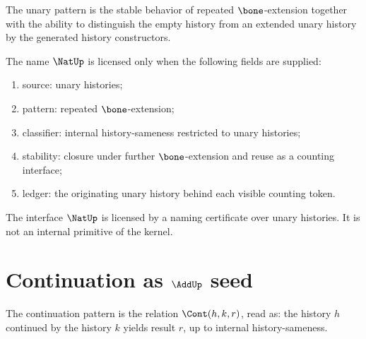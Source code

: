 \begin{definition}
\label{def:unary-pattern-hardening}
The unary pattern is the stable behavior of repeated \(\bone\)-extension together with the ability to distinguish the empty history from an extended unary history by the generated history constructors.
\end{definition}

\begin{definition}
\label{def:natup-certificate-seed}
The name \(\NatUp\) is licensed only when the following fields are supplied:
\begin{enumerate}
  \item source: unary histories;
  \item pattern: repeated \(\bone\)-extension;
  \item classifier: internal history-sameness restricted to unary histories;
  \item stability: closure under further \(\bone\)-extension and reuse as a counting interface;
  \item ledger: the originating unary history behind each visible counting token.
\end{enumerate}
\end{definition}

\begin{corollary}
\label{cor:natup-certificate-seed-not-primitive}
The interface \(\NatUp\) is licensed by a naming certificate over unary histories. It is not an internal primitive of the kernel.
\end{corollary}

\section{Continuation as \texorpdfstring{\(\AddUp\)}{Add-up} seed}

\begin{definition}
\label{def:continuation-pattern-hardening}
The continuation pattern is the relation \(\Cont(h,k,r)\), read as: the history \(h\) continued by the history \(k\) yields result \(r\), up to internal history-sameness.
\end{definition}

